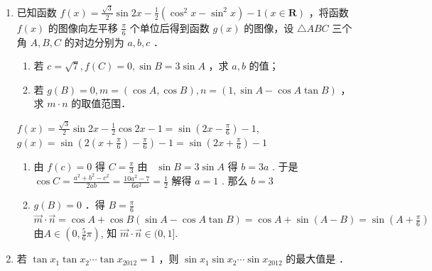\begin{enumerate}
    \item 已知函数 $f(x)=\frac{\sqrt{3}}{2} \sin 2 x-\frac{1}{2}\left(\cos ^2 x-\sin ^2 x\right)-1(x \in \mathbf{R})$ ，将函数 $f(x)$ 的图像向左平移 $\frac{\pi}{6}$ 个单位后得到函数 $g(x)$ 的图像，设 $\triangle A B C$ 三个角 $A, B, C$ 的对边分别为 $a, b, c$ ．
    \begin{enumerate}
        \item 若 $c=\sqrt{7}, f(C)=0, \sin B=3 \sin A$ ，求 $a, b$ 的值；
        \item 若 $g(B)=0, m=(\cos A, \cos B), n=(1, \sin A-\cos A \tan B)$ ，求 $m \cdot n$ 的取值范围．
    \end{enumerate}
    \begin{jieda}
        $f(x)=\frac{\sqrt{3}}{2} \sin 2 x-\frac{1}{2} \cos 2 x-1=\sin \left(2 x-\frac{\pi}{6}\right)-1$,
        $g(x)=\sin \left(2\left(x+\frac{\pi}{6}\right)-\frac{\pi}{6}\right)-1=\sin \left(2 x+\frac{\pi}{6}\right)-1$
        \begin{enumerate}
            \item 
            由 $f(c)=0$ 得 $C=\frac{\pi}{3}$ 
            由 \ $\sin B=3 \sin A$ 得 $b=3 a$ .
            于是 $\cos C=\frac{a^2+b^2-c^2}{2 a b}=\frac{10 a^2-7}{6 a^2}=\frac{1}{2} $
            解得 $a=1$ . 那么 $b=3$
            \item $g(B)=0$ ．得 $B=\frac{\pi}{6}$ \\
            $ \vec{m} \cdot \vec{n} =\cos A+\cos B(\sin A-\cos A \tan B) =\cos A+\sin (A-B) =\sin \left(A+\frac{\pi}{6}\right) $ \\
            由$A \in\left(0, \frac{5}{6} \pi\right)$, 知  $\vec{m} \cdot \vec{n} \in(0,1]$.

        \end{enumerate}
    \end{jieda}

\item 若 $\tan x_1 \tan x_2 \cdots \tan x_{2012}=1$ ，则 $\sin x_1 \sin x_2 \cdots \sin x_{2012}$ 的最大值是 ．


\end{enumerate}
